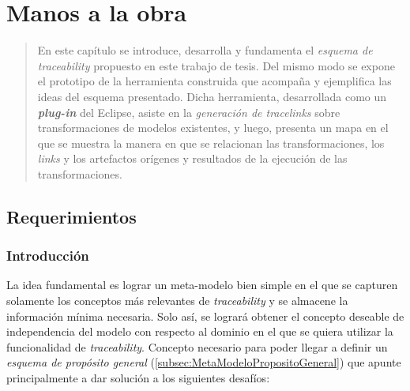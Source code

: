 \documentclass[a4paper,12pt,twoside,spanish,openright]{book}
\begin{document}
\chapter{Manos a la obra}
\label{cap:Propuesta}

\begin{quotation}
En este capítulo se introduce, desarrolla y fundamenta el \textit{esquema de
traceability} propuesto en este trabajo de tesis. Del mismo modo se expone el prototipo de la herramienta construida que acompaña y ejemplifica las ideas del esquema presentado. Dicha herramienta, desarrollada como un \textit{\textbf{plug-in}} del  \textsf{Eclipse}, asiste en la \textit{generación de tracelinks} sobre transformaciones de modelos existentes, y luego, presenta un mapa en el que se muestra la manera en que se relacionan las transformaciones, los \textit{links} y los artefactos orígenes y resultados de la ejecución de las transformaciones.
\end{quotation}


\bigskip


\minitoc 


\clearpage


\section{Requerimientos}


\subsection{Introducción}
\label{sec:EsquemaPropIntro}

La idea fundamental es lograr un meta-modelo bien simple en el que se capturen solamente los conceptos más relevantes de \textit{traceability} y se almacene la información mínima necesaria. Solo así, se logrará obtener el concepto deseable de independencia del modelo con respecto al dominio en el que se quiera utilizar la funcionalidad de \textit{traceability}. Concepto necesario para poder llegar a definir un \textit{esquema de propósito general} (\ref{subsec:MetaModeloPropositoGeneral}) que apunte principalmente a dar solución a los siguientes desafíos:
\end{document}
